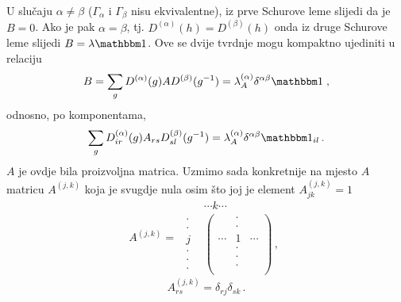 U slučaju $\alpha\neq\beta$ ($\Gamma_\alpha$ i $\Gamma_\beta$ nisu 
ekvivalentne),
iz prve Schurove leme slijedi da je $B=0$. Ako je pak $\alpha=\beta$, tj.
$D^{(\alpha)}(h)=D^{(\beta)}(h)$ onda iz druge Schurove leme
slijedi $B=\lambda \Eins$.
Ove se dvije tvrdnje mogu kompaktno ujediniti u relaciju
\begin{equation}
  B = \sum_g D^{(\alpha)}(g) A D^{(\beta)}(g^{-1}) =
 \lambda^{(\alpha)}_A \delta^{\alpha\beta} \Eins \;,
\end{equation}
odnosno, po komponentama,
\begin{equation}
\sum_g D^{(\alpha)}_{ir}(g) A_{rs} D^{(\beta)}_{sl}(g^{-1})
 = \lambda_{A}^{(\alpha)} \delta^{\alpha\beta} \Eins_{il} \,.
 \label{eq:ortpokomp}
\end{equation}
$A$ je ovdje bila proizvoljna matrica. Uzmimo sada konkretnije na mjesto $A$
matricu $A^{(j,k)}$ koja je svugdje nula osim što joj je
element $A^{(j,k)}_{jk}=1$
\begin{displaymath}
 A^{(j,k)}=
\begin{array}{cc}
 & \cdots k \cdots \\
        \begin{array}{c}
         \cdot \\ \cdot \\ j \\ \cdot \\ \cdot \\ \cdot 
        \end{array}
 & 
\begin{pmatrix}
  & \cdot & \\
  & \cdot & \\
 \cdots & 1  & \cdots \\
  & \cdot & \\
  & \cdot & \\
  & \cdot & \\
\end{pmatrix} \,,
\end{array}
\end{displaymath}
\begin{displaymath}
A^{(j,k)}_{rs}=\delta_{rj}\delta_{sk} \,.
\end{displaymath}

